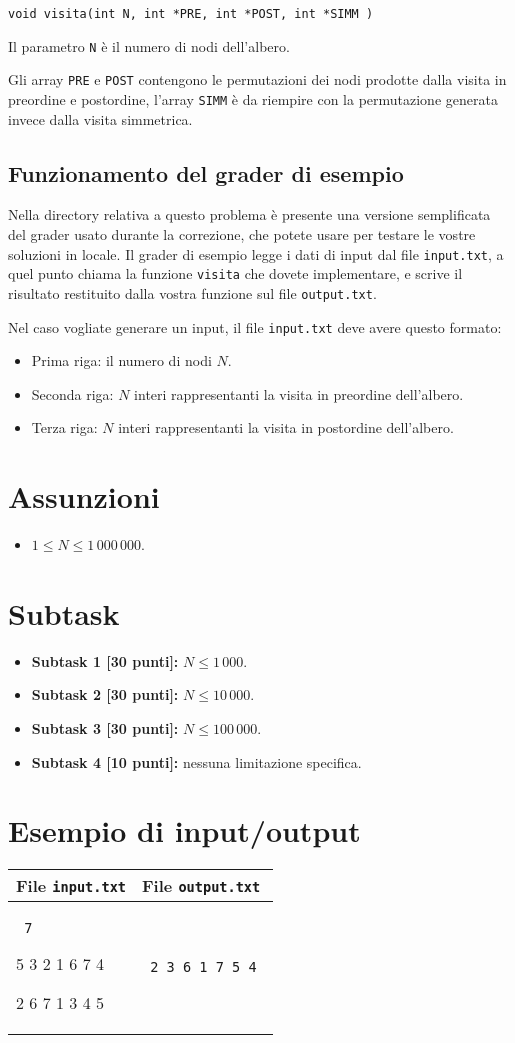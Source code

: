 \documentclass[a4paper,11pt]{article}
\newcommand{\file}[1]{\texttt{#1}}
\newcommand{\esempio}[2]{
\noindent\begin{minipage}{\textwidth}
\begin{tabular}{|p{11cm}|p{5cm}|}
	\hline
	\textbf{File \file{input.txt}} & \textbf{File \file{output.txt}}\\
	\hline
	\tt \small #1 &
	\tt \small #2 \\
	\hline
\end{tabular}
\end{minipage}
}
\begin{document}
\begin{verbatim}
void visita(int N, int *PRE, int *POST, int *SIMM )
\end{verbatim}

Il parametro \texttt{N} è il numero di nodi dell'albero.

Gli array \texttt{PRE} e \texttt{POST} contengono le permutazioni dei nodi prodotte dalla visita in preordine e postordine,
l'array \texttt{SIMM} \`e da riempire con la permutazione generata invece dalla visita simmetrica.

\subsection*{Funzionamento del grader di esempio}
Nella directory relativa a questo problema è presente una versione
semplificata del grader usato durante la correzione, che potete usare
per testare le vostre soluzioni in locale. Il grader di esempio legge
i dati di input dal file \file{input.txt}, a quel punto chiama la
funzione \texttt{visita} che dovete implementare, e scrive il risultato
restituito dalla vostra funzione sul file \file{output.txt}.

Nel caso vogliate generare un input, il file \file{input.txt} deve
avere questo formato:
\begin{itemize}[noitemsep]
\item Prima riga: il numero di nodi $N$.
\item Seconda riga: $N$ interi rappresentanti la visita in preordine dell'albero.
\item Terza riga: $N$ interi rappresentanti la visita in postordine dell'albero.
\end{itemize}


\section*{Assunzioni}
\begin{itemize}[nolistsep, noitemsep]
\item $1 \le N \le 1\,000\,000$.
\end{itemize}

\section*{Subtask}
\begin{itemize}
\item \textbf{Subtask 1 [30 punti]:} $N \le 1\,000$.
\item \textbf{Subtask 2 [30 punti]:} $N \le 10\,000$.
\item \textbf{Subtask 3 [30 punti]:} $N \le 100\,000$.
\item \textbf{Subtask 4 [10 punti]:} nessuna limitazione specifica.
\end{itemize}


\section*{Esempio di input/output}
\esempio{
7

5 3 2 1 6 7 4

2 6 7 1 3 4 5

}{
2 3 6 1 7 5 4
}
\end{document}
